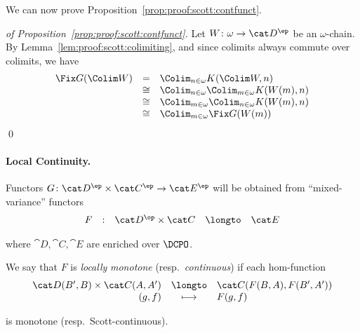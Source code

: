 We can now prove Proposition~\ref{prop:proof:scott:contfunct}.

\begin{proof}[of Proposition~\ref{prop:proof:scott:contfunct}]
Let $W \colon \omega \to \cat D^\ep$ be an $\omega$-chain.
By Lemma~\ref{lem:proof:scott:colimiting},
and since colimits always commute over colimits,
we have
\[
\begin{array}{l l l}
  \Fix G(\Colim W)
& =
& \Colim_{n \in \omega} K(\Colim W,n)
\\

& \cong
& \Colim_{n \in \omega} \Colim_{m \in \omega} K(W(m),n)
\\

& \cong
& \Colim_{m \in \omega} \Colim_{n \in \omega} K(W(m),n)
\\

& \cong
& \Colim_{m \in \omega} \Fix G(W(m))
\end{array}
\]
\qed
\end{proof}


\paragraph{Local Continuity.}
Functors $G \colon \cat D^\ep \times \cat C^\ep \to \cat E^\ep$
will be obtained from ``mixed-variance'' functors
\[
\begin{array}{*{5}{l}}
  F
& :
& \cat D^\op \times \cat C
& \longto
& \cat E
\end{array}
\]

\noindent
where
$\cat D,\cat C, \cat E$ are enriched over $\DCPO$.

\begin{definition}
\label{def:proof:scott:loc}
We say that $F$
is \emph{locally} \emph{monotone} (resp.\ \emph{continuous})
if each hom-function
\[
\begin{array}{r c l}
  \cat D(B',B) \times \cat C(A,A')
& \longto
& \cat C(F(B,A), F(B',A'))
\\

  (g,f)
& \longmapsto
& F(g,f)
\end{array}
\]

\noindent
is monotone (resp.\ Scott-continuous).
\end{definition}

